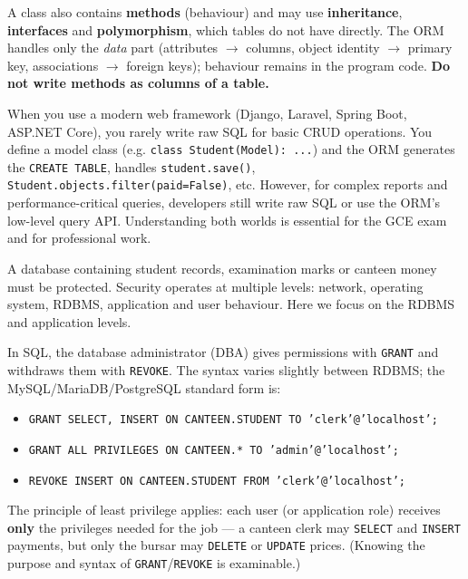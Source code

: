 \documentclass[11pt]{article}
\newcommand{\cle}[1]{{\popxbold\color{popdark}#1}}
\newcounter{popsec}
\newcounter{popsub}
\newcommand{\courssub}[1]{%
  \stepcounter{popsub}%
  \par\vspace{9pt}\noindent{\popxbold\fontsize{11.5}{13}\selectfont\color{popink}{\color{poporange}\thepopsec.\thepopsub}\hspace{6pt}#1}\par\nopagebreak\vspace{4pt}
}
\begin{document}
\begin{attention}
A class also contains \textbf{methods} (behaviour) and may use \textbf{inheritance}, \textbf{interfaces} and \textbf{polymorphism}, which tables do not have directly. The ORM handles only the \emph{data} part (attributes $\rightarrow$ columns, object identity $\rightarrow$ primary key, associations $\rightarrow$ foreign keys); behaviour remains in the program code. \textbf{Do not write methods as columns of a table.}
\end{attention}

\begin{savaistu}
When you use a modern web framework (Django, Laravel, Spring Boot, ASP.NET Core), you rarely write raw SQL for basic CRUD operations. You define a model class (e.g. \texttt{class Student(Model): ...}) and the ORM generates the \texttt{CREATE TABLE}, handles \texttt{student.save()}, \texttt{Student.objects.filter(paid=False)}, etc. However, for complex reports and performance-critical queries, developers still write raw SQL or use the ORM's low-level query API. Understanding both worlds is essential for the GCE exam and for professional work.
\end{savaistu}

\courssub{Basic Database Security}

A database containing student records, examination marks or canteen money must be protected. Security operates at multiple levels: network, operating system, RDBMS, application and user behaviour. Here we focus on the RDBMS and application levels.

\begin{propriete}
In SQL, the database administrator (DBA) gives permissions with \texttt{GRANT} and withdraws them with \texttt{REVOKE}. The syntax varies slightly between RDBMS; the MySQL/MariaDB/PostgreSQL standard form is:
\begin{itemize}
\item \texttt{GRANT SELECT, INSERT ON CANTEEN.STUDENT TO 'clerk'@'localhost';}
\item \texttt{GRANT ALL PRIVILEGES ON CANTEEN.* TO 'admin'@'localhost';}
\item \texttt{REVOKE INSERT ON CANTEEN.STUDENT FROM 'clerk'@'localhost';}
\end{itemize}
The principle of \cle{least privilege} applies: each user (or application role) receives \textbf{only} the privileges needed for the job — a canteen clerk may \texttt{SELECT} and \texttt{INSERT} payments, but only the bursar may \texttt{DELETE} or \texttt{UPDATE} prices. (Knowing the purpose and syntax of \texttt{GRANT}/\texttt{REVOKE} is examinable.)
\end{propriete}
\end{document}

